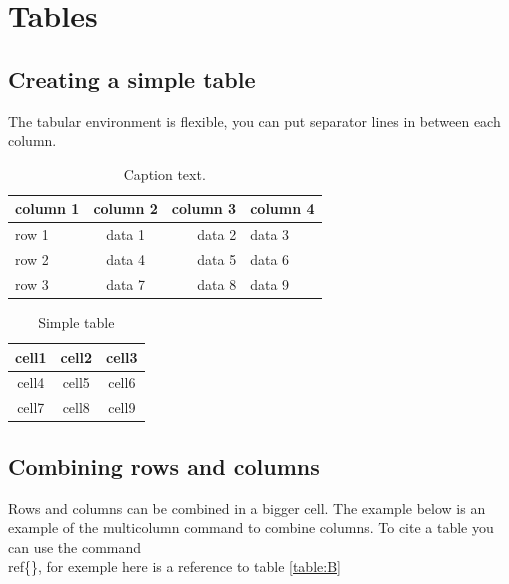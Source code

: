 \documentclass[Theme1]{{template_material/eurostat}}
\begin{document}
\newpage %
\section{Tables}

\subsection{Creating a simple table}
The tabular environment is flexible, you can put separator lines in between each column.

\begin{table}[h]
\caption{Caption text.\label{tab1}}

\begin{tabular}{@{}l|crl@{}}
column 1 & column 2  & column 3 &   column 4\\\hline
row 1    & data 1   & data 2  & data 3  \\
row 2    & data 4   & data 5  & data 6  \\
row 3    & data 7   & data 8  & data 9  \\\hline
\end{tabular}
\end{table}

\begin{table}[h]
 \caption{Simple table}
 \label{table:A}
    \begin{tabular}{ c|c|c } 
     \hline
     cell1 & cell2 & cell3 \\ 
     \hline
     cell4 & cell5 & cell6 \\ 
     \hline
     cell7 & cell8 & cell9 \\ 
     \hline
    \end{tabular}
\end{table}

\subsection{Combining rows and columns}

Rows and columns can be combined in a bigger cell. The example below is an example of the multicolumn command to combine columns. To cite a table you can use the command \\ref\{\}, for exemple here is a reference to table \ref{table:B}
\end{document}
